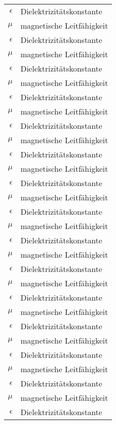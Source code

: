 \begin{nomenclature}

\begin{longtable}{rl}
  $\epsilon$ & Dielektrizitätskonstante  \\
  $\mu$      & magnetische Leitfähigkeit \\
  $\epsilon$ & Dielektrizitätskonstante  \\
  $\mu$      & magnetische Leitfähigkeit \\
  $\epsilon$ & Dielektrizitätskonstante  \\
  $\mu$      & magnetische Leitfähigkeit \\
  $\epsilon$ & Dielektrizitätskonstante  \\
  $\mu$      & magnetische Leitfähigkeit \\
  $\epsilon$ & Dielektrizitätskonstante  \\
  $\mu$      & magnetische Leitfähigkeit \\
  $\epsilon$ & Dielektrizitätskonstante  \\
  $\mu$      & magnetische Leitfähigkeit \\
  $\epsilon$ & Dielektrizitätskonstante  \\
  $\mu$      & magnetische Leitfähigkeit \\
  $\epsilon$ & Dielektrizitätskonstante  \\
  $\mu$      & magnetische Leitfähigkeit \\
  $\epsilon$ & Dielektrizitätskonstante  \\
  $\mu$      & magnetische Leitfähigkeit \\
  $\epsilon$ & Dielektrizitätskonstante  \\
  $\mu$      & magnetische Leitfähigkeit \\
  $\epsilon$ & Dielektrizitätskonstante  \\
  $\mu$      & magnetische Leitfähigkeit \\
  $\epsilon$ & Dielektrizitätskonstante  \\
  $\mu$      & magnetische Leitfähigkeit \\
  $\epsilon$ & Dielektrizitätskonstante  \\
  $\mu$      & magnetische Leitfähigkeit \\
  $\epsilon$ & Dielektrizitätskonstante  \\
  $\mu$      & magnetische Leitfähigkeit \\
  $\epsilon$ & Dielektrizitätskonstante  \\

\end{longtable}
\end{nomenclature}
